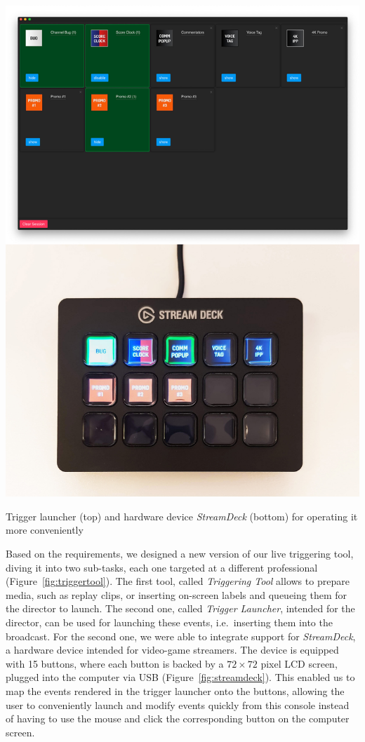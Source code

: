 \documentclass[sigchi-a, authorversion]{acmart}
\begin{document}
\begin{marginfigure}
    \includegraphics[width=\marginparwidth-10pt]{Figures/streamdeck.jpg}
    \caption{Trigger launcher (top) and hardware device \emph{StreamDeck} (bottom) for operating it more conveniently}
    \label{fig:streamdeck}
\end{marginfigure}

Based on the requirements, we designed a new version of our live triggering
tool, diving it into two sub-tasks, each one targeted at a different professional
(Figure~\ref{fig:triggertool}). The first tool, called \emph{Triggering Tool} allows to prepare media,
such as replay clips, or inserting on-screen labels and queueing
them for the director to launch. The second one, called \emph{Trigger Launcher}, intended for the director, can
be used for launching these events, i.e.\ inserting them into the broadcast.
For the second one, we were able to integrate support for \emph{StreamDeck}, a
hardware device intended for video-game streamers. The device is equipped with 15
buttons, where each button is backed by a $72\times72$ pixel LCD screen, plugged into the computer via USB
(Figure~\ref{fig:streamdeck}). This enabled us to map the events rendered in the
trigger launcher onto the buttons, allowing the user to conveniently launch and
modify events quickly from this console instead of having to use the mouse and
click the corresponding button on the computer screen.
\end{document}
